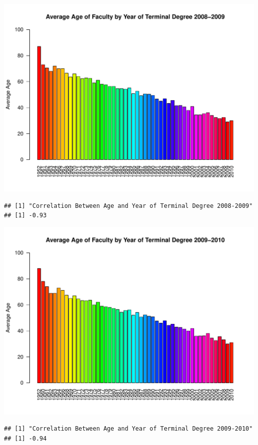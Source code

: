 \documentclass[12pt,a4paper]{article}\usepackage[]{graphicx}\usepackage[]{color}
\makeatletter
\def\maxwidth{ %
  \ifdim\Gin@nat@width>\linewidth
    \linewidth
  \else
    \Gin@nat@width
  \fi
}
\newenvironment{kframe}{%
 \def\at@end@of@kframe{}%
 \ifinner\ifhmode%
  \def\at@end@of@kframe{\end{minipage}}%
  \begin{minipage}{\columnwidth}%
 \fi\fi%
 \def\FrameCommand##1{\hskip\@totalleftmargin \hskip-\fboxsep
 \colorbox{shadecolor}{##1}\hskip-\fboxsep
     \hskip-\linewidth \hskip-\@totalleftmargin \hskip\columnwidth}%
 \MakeFramed {\advance\hsize-\width
   \@totalleftmargin\z@ \linewidth\hsize
   \@setminipage}}%
 {\par\unskip\endMakeFramed%
 \at@end@of@kframe}
\newenvironment{knitrout}{}{} %
\theoremstyle{definition}
\makeatother
\begin{document}
\begin{knitrout}
\begin{kframe}
\end{kframe}
\includegraphics[width=\maxwidth]{figure/unnamed-chunk-11-5} 
\begin{kframe}\begin{verbatim}
## [1] "Correlation Between Age and Year of Terminal Degree 2008-2009"
## [1] -0.93
\end{verbatim}
\end{kframe}
\includegraphics[width=\maxwidth]{figure/unnamed-chunk-11-6} 
\begin{kframe}\begin{verbatim}
## [1] "Correlation Between Age and Year of Terminal Degree 2009-2010"
## [1] -0.94
\end{verbatim}
\end{kframe}

\end{knitrout}
\end{document}
